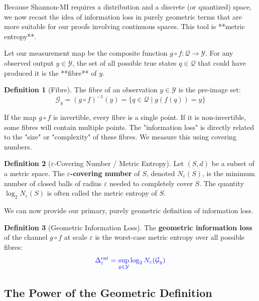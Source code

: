 \documentclass[12pt]{article}
\theoremstyle{definition}
\newtheorem{definition}{Definition}[section]
\theoremstyle{plain}
\begin{document}
Because Shannon-MI requires a distribution and a discrete (or quantized) space, we now recast the idea of information loss in purely geometric terms that are more suitable for our proofs involving continuous spaces. This tool is **metric entropy**.

Let our measurement map be the composite function $g \circ f: \mathcal{Q} \to \mathcal{Y}$. For any observed output $y \in \mathcal{Y}$, the set of all possible true states $q \in \mathcal{Q}$ that could have produced it is the **fibre** of $y$.

\begin{definition}[Fibre]
The fibre of an observation $y \in \mathcal{Y}$ is the pre-image set:
\[
\mathcal{G}_y = (g \circ f)^{-1}(y) = \{ q \in \mathcal{Q} \mid g(f(q)) = y \}
\]
\end{definition}
If the map $g \circ f$ is invertible, every fibre is a single point. If it is non-invertible, some fibres will contain multiple points. The "information loss" is directly related to the "size" or "complexity" of these fibres. We measure this using covering numbers.

\begin{definition}[$\varepsilon$-Covering Number / Metric Entropy]
Let $(S, d)$ be a subset of a metric space. The \textbf{$\varepsilon$-covering number} of $S$, denoted $N_\varepsilon(S)$, is the minimum number of closed balls of radius $\varepsilon$ needed to completely cover $S$. The quantity $\log_2 N_\varepsilon(S)$ is often called the metric entropy of $S$.
\end{definition}

We can now provide our primary, purely geometric definition of information loss.

\begin{definition}[Geometric Information Loss]
The \textbf{geometric information loss} of the channel $g \circ f$ at scale $\varepsilon$ is the worst-case metric entropy over all possible fibres:
\[
\color{blue} \Delta^{\text{ent}}_\varepsilon = \sup_{y \in \mathcal{Y}} \log_2 N_\varepsilon(\mathcal{G}_y)
\]
\end{definition}

\subsection{The Power of the Geometric Definition}
\end{document}
